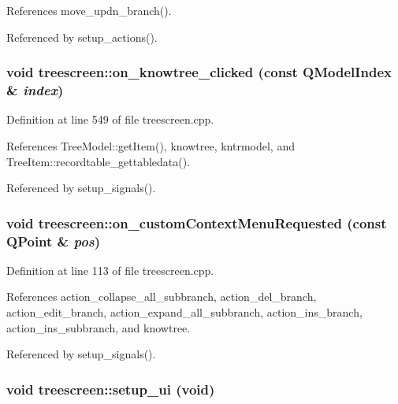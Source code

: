 References move\_\-updn\_\-branch().

Referenced by setup\_\-actions().
\subsubsection{\setlength{\rightskip}{0pt plus 5cm}void treescreen::on\_\-knowtree\_\-clicked (const QModel\-Index \& {\em index})\hspace{0.3cm}{\tt  [private, slot]}}\label{classtreescreen_5ebfb6607ec8ad14d44ec1e6c3dd2389}




Definition at line 549 of file treescreen.cpp.

References Tree\-Model::get\-Item(), knowtree, kntrmodel, and Tree\-Item::recordtable\_\-gettabledata().

Referenced by setup\_\-signals().
\subsubsection{\setlength{\rightskip}{0pt plus 5cm}void treescreen::on\_\-custom\-Context\-Menu\-Requested (const QPoint \& {\em pos})\hspace{0.3cm}{\tt  [private, slot]}}\label{classtreescreen_be096223f04da6a625e2ed143b983997}




Definition at line 113 of file treescreen.cpp.

References action\_\-collapse\_\-all\_\-subbranch, action\_\-del\_\-branch, action\_\-edit\_\-branch, action\_\-expand\_\-all\_\-subbranch, action\_\-ins\_\-branch, action\_\-ins\_\-subbranch, and knowtree.

Referenced by setup\_\-signals().
\subsubsection{\setlength{\rightskip}{0pt plus 5cm}void treescreen::setup\_\-ui (void)\hspace{0.3cm}{\tt  [private]}}\label{classtreescreen_428e0d2e2f10be1761f2d30343259910}




